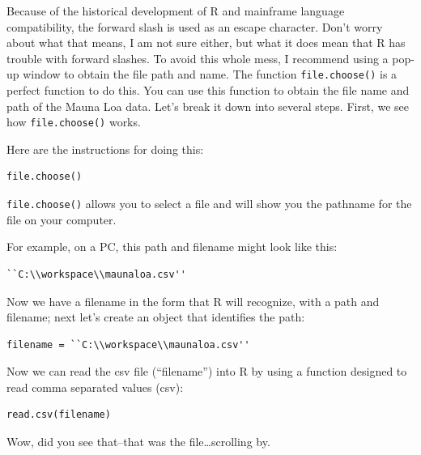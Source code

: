 \documentclass{tufte-handout}\usepackage[]{graphicx}\usepackage[]{xcolor}
\begin{document}
Because of the historical development of R and mainframe language compatibility, the forward slash is used as an escape character. Don't worry about what that means, I am not sure either, but what it does mean that R has trouble with forward slashes. To avoid this whole mess, I recommend using a pop-up window to obtain the file path and name.  The function \texttt{file.choose()} is a perfect function to do this. You can use this function to obtain the file name and path of the Mauna Loa data.  Let's break it down into several steps. First, we see how \texttt{file.choose()} works.  

Here are the instructions for doing this:

\begin{verbatim}
file.choose()
\end{verbatim}

\texttt{file.choose()} allows you to select a file and will show you the pathname for the file on your computer. 


For example, on a PC, this path and filename might look like this: 
\begin{verbatim}
``C:\\workspace\\maunaloa.csv''
\end{verbatim}

Now we have a filename in the form that R will recognize, with a path and filename; next let's create an object that identifies the path:

\begin{verbatim}
filename = ``C:\\workspace\\maunaloa.csv''
\end{verbatim}
Now we can read the csv file (``filename'') into R by using a function designed to read comma separated values (csv):

\begin{verbatim}
read.csv(filename) 
\end{verbatim}

Wow, did you see that--that was the file\ldots scrolling by. 
\end{document}
